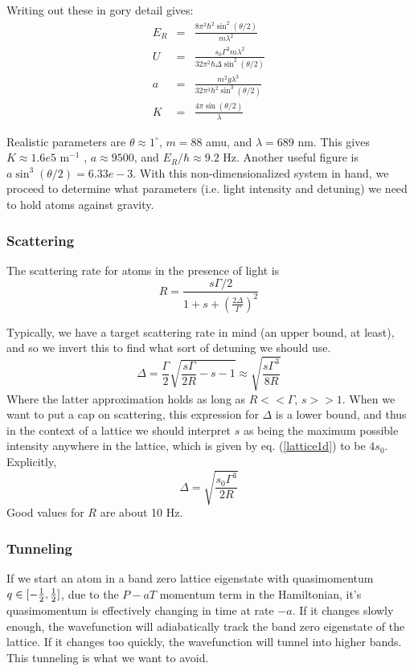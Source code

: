 \documentclass[aps,twocolumn,prb,floatfix,amsmath,amssymb,groupedaddress]{revtex4}
\begin{document}
Writing out these in gory detail gives:
\begin{eqnarray*}
E_R & = &  \frac{8\pi^2\hbar^2 \sin^2(\theta/2)}{m\lambda^2} \\
U & = & \frac{s_0 \Gamma^2 m \lambda^2}{32\pi^2\hbar\Delta\sin^2(\theta/2)} \\
a & = & \frac{m^2 g \lambda^3}{32\pi^3 \hbar^2 \sin^3(\theta/2)} \\
K & = & \frac{4\pi \sin(\theta/2)}{\lambda}
\end{eqnarray*}

Realistic parameters are $\theta\approx 1^{\circ}$, $m=88$ amu, and $\lambda = 689$ nm.  This gives $K\approx 1.6e5$ m$^{-1}$ , $a\approx 9500$, and $E_R/\hbar \approx 9.2$ Hz.  Another useful figure is $a\sin^3(\theta/2) = 6.33e-3$.  With this non-dimensionalized system in hand, we proceed to determine what parameters (i.e. light intensity and detuning) we need to hold atoms against gravity.

\subsubsection{Scattering}
The scattering rate for atoms in the presence of light is 
\begin{equation}
R = \frac{s\Gamma/2}{1+s+\left(\frac{2\Delta}{\Gamma}\right)^2}
\label{scattering}
\end{equation}

Typically, we have a target scattering rate in mind (an upper bound, at least), and so we invert this to find what sort of detuning we should use.  
\begin{equation}
\Delta = \frac{\Gamma}{2} \sqrt{\frac{s\Gamma}{2R} - s - 1} \approx \sqrt{\frac{s\Gamma^3}{8R}}
\label{detuning}
\end{equation}
Where the latter approximation holds as long as $R<<\Gamma$, $s>>1$.  When we want to put a cap on scattering, this expression for $\Delta$ is a lower bound, and thus in the context of a lattice we should interpret $s$ as being the maximum possible intensity anywhere in the lattice, which is given by eq. (\ref{lattice1d}) to be $4s_0$.  Explicitly, \[\Delta = \sqrt{\frac{s_0 \Gamma^3}{2R}}\]
Good values for $R$ are about 10 Hz.

\subsubsection{Tunneling}
If we start an atom in a band zero lattice eigenstate with quasimomentum $q\in[-{\frac{1}{2}},{\frac{1}{2}}]$, due to the $P-aT$ momentum term in the Hamiltonian, it's quasimomentum is effectively changing in time at rate $-a$.  If it changes slowly enough, the wavefunction will adiabatically track the band zero eigenstate of the lattice.  If it changes too quickly, the wavefunction will tunnel into higher bands.  This tunneling is what we want to avoid.
\end{document}
